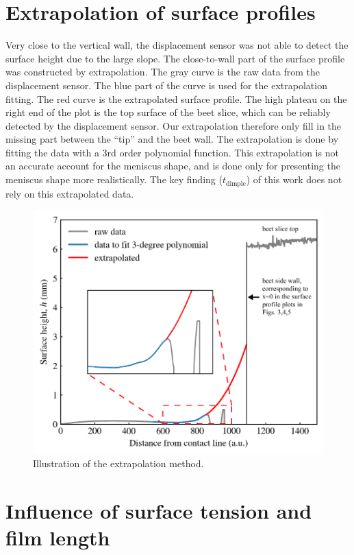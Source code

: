 \documentclass[aps,prfluids,amsmath,amssymb,superscriptaddress,longbibliography]{revtex4-2}
\newif\ifhighlight
\newcommand{\hl}[1]{\ifhighlight\textcolor{blue}{#1}\else#1\fi}
\begin{document}
\newpage

\section{Extrapolation of surface profiles}\label{app:extrapolation}

Very close to the vertical wall, the displacement sensor was not able to detect the surface height due to the large slope.
The close-to-wall part of the surface profile was constructed by extrapolation.
The gray curve is the raw data from the displacement sensor. 
The blue part of the curve is used for the extrapolation fitting. The red curve is the extrapolated surface profile. 
The high plateau on the right end of the plot is the top surface of the beet slice, which can be reliably detected by the displacement sensor. 
Our extrapolation therefore only fill in the missing part between the ``tip'' and the beet wall. 
The extrapolation is done by fitting the data with a 3rd order polynomial function.
\hl{This extrapolation is not an accurate account for the meniscus shape, and is done only for presenting the meniscus shape more realistically.
The key finding ($t_\mathrm{dimple}$) of this work does not rely on this extrapolated data.}

\begin{figure}[ht]
    \centering
    \includegraphics[width=.8\textwidth]{Figures/extrapolation_illustration}
    \caption{
    Illustration of the extrapolation method. 
    }
    \label{fig:extrapolation}
\end{figure}

\newpage

\section{Influence of \hl{surface tension and film length}}\label{app:parameters}
\end{document}
